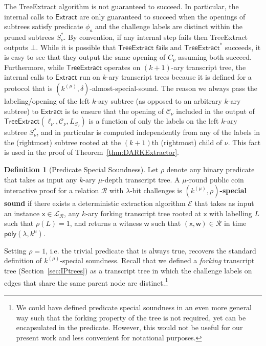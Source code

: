 \documentclass{article}
\theoremstyle{definition}
\newtheorem{definition}{Definition}
\begin{document}
The \textsf{TreeExtract} algorithm is not guaranteed to succeed. In particular, the internal calls to $\textsf{Extract}$ are only guaranteed to succeed when the openings of subtrees satisfy predicate $\phi_a$ and the challenge labels are distinct within the pruned subtrees $S^*_\nu$. By convention, if any internal step fails then \textsf{TreeExtract} outputs $\bot$. While it is possible that $\textsf{TreeExtract}$ $\mathsf{fail}$s and $\textsf{TreeExtract}^*$ succeeds, it is easy to see that they output the same opening of $C_\nu$ assuming both succeed. Furthermore, while $\textsf{TreeExtract}$ operates on $(k+1)$-ary transcript tree, the internal calls to $\textsf{Extract}$ run on $k$-ary transcript trees because it is defined for a protocol that is $(k^{(\mu)}, \delta)$-almost-special-sound. The reason we always pass the labeling/opening of the left $k$-ary subtree (as opposed to an arbitrary $k$-ary subtree) to $\textsf{Extract}$ is to ensure that the opening of $\mathcal{C}_\nu$ included in the output of $\textsf{TreeExtract}(\ell_\nu, \mathcal{C}_\nu, L_{S_\nu})$ is a function of only the labels on the left $k$-ary subtree $S^*_\nu$, and in particular is computed independently from any of the labels in the (rightmost) subtree rooted at the $(k+1)$th (rightmost) child of $\nu$. This fact is used in the proof of Theorem~\ref{thm:DARKExtractor}.

\begin{definition}[Predicate Special Soundness]
	Let $\rho$ denote any binary predicate that takes as input any $k$-ary $\mu$-depth transcript tree. A $\mu$-round public coin interactive proof for a relation $\mathcal{R}$ with $\lambda$-bit challenges is \textbf{$(k^{(\mu)}, \rho)$-special sound} if there exists a deterministic extraction algorithm $\mathcal{E}$ that takes as input an instance $\mathsf{x} \in \mathcal{L}_\mathcal{R}$, any $k$-ary forking transcript tree rooted at $\mathsf{x}$ with labelling $L$ such that $\rho(L) = 1$, and returns a witness $\mathsf{w}$ such that $(\mathsf{x}, \mathsf{w}) \in \mathcal{R}$ in time $\textsf{poly}(\lambda, k^\mu)$. 
\end{definition}

Setting $\rho = 1$, i.e. the trivial predicate that is always true, recovers the standard definition of $k^{(\mu)}$-special soundness. Recall that we defined a \emph{forking} transcript tree (Section~\ref{sec:IPtrees}) as a transcript tree in which the challenge labels on edges that share the same parent node are distinct.\footnote{We could have defined predicate special soundness in an even more general way such that the forking property of the tree is not required, yet can be encapsulated in the predicate. However, this would not be useful for our present work and less convenient for notational purposes.} 
\end{document}
